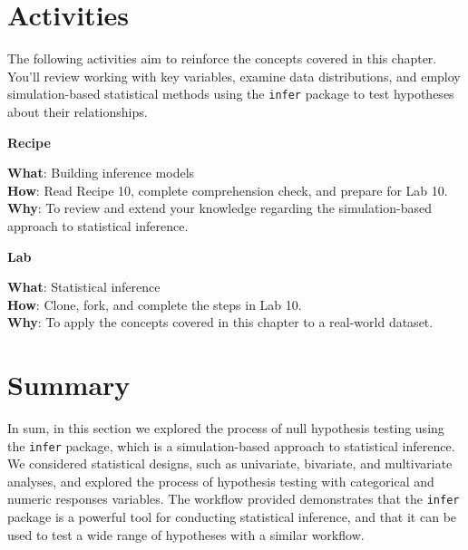 \documentclass[
  letterpaper,
]{latex/krantz}
\theoremstyle{definition}
\theoremstyle{remark}
\begin{document}
\section*{Activities}\label{activities-8}


The following activities aim to reinforce the concepts covered in this
chapter. You'll review working with key variables, examine data
distributions, and employ simulation-based statistical methods using the
\texttt{infer} package to test hypotheses about their relationships.

\begin{tcolorbox}[enhanced jigsaw, colframe=quarto-callout-color-frame, breakable, bottomrule=.15mm, arc=.35mm, left=2mm, opacityback=0, rightrule=.15mm, colback=white, toprule=.15mm, leftrule=.75mm]

\textbf{ Recipe}

\textbf{What}: Building inference models\\
\textbf{How}: Read Recipe 10, complete comprehension check, and prepare
for Lab 10.\\
\textbf{Why}: To review and extend your knowledge regarding the
simulation-based approach to statistical inference.

\end{tcolorbox}

\begin{tcolorbox}[enhanced jigsaw, colframe=quarto-callout-color-frame, breakable, bottomrule=.15mm, arc=.35mm, left=2mm, opacityback=0, rightrule=.15mm, colback=white, toprule=.15mm, leftrule=.75mm]

\textbf{ Lab}

\textbf{What}: Statistical inference\\
\textbf{How}: Clone, fork, and complete the steps in Lab 10.\\
\textbf{Why}: To apply the concepts covered in this chapter to a
real-world dataset.

\end{tcolorbox}

\section*{Summary}\label{summary-9}


In sum, in this section we explored the process of null hypothesis
testing using the \texttt{infer} package, which is a simulation-based
approach to statistical inference. We considered statistical designs,
such as univariate, bivariate, and multivariate analyses, and explored
the process of hypothesis testing with categorical and numeric responses
variables. The workflow provided demonstrates that the \texttt{infer}
package is a powerful tool for conducting statistical inference, and
that it can be used to test a wide range of hypotheses with a similar
workflow.
\end{document}
